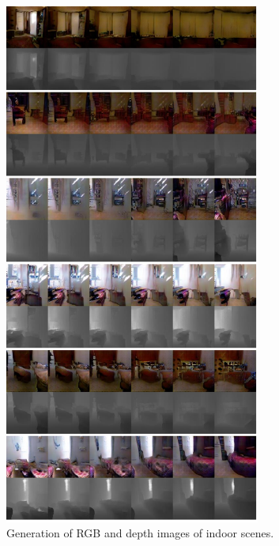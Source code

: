 \begin{figure}[tbh!]
\centering
\includegraphics[trim=0in 0in 0in 0in, width=0.75\textwidth]{result_nyu_big1.pdf}
\caption{Generation of RGB and depth images of indoor scenes.}
\label{fig::result_nyu1}
\end{figure}


